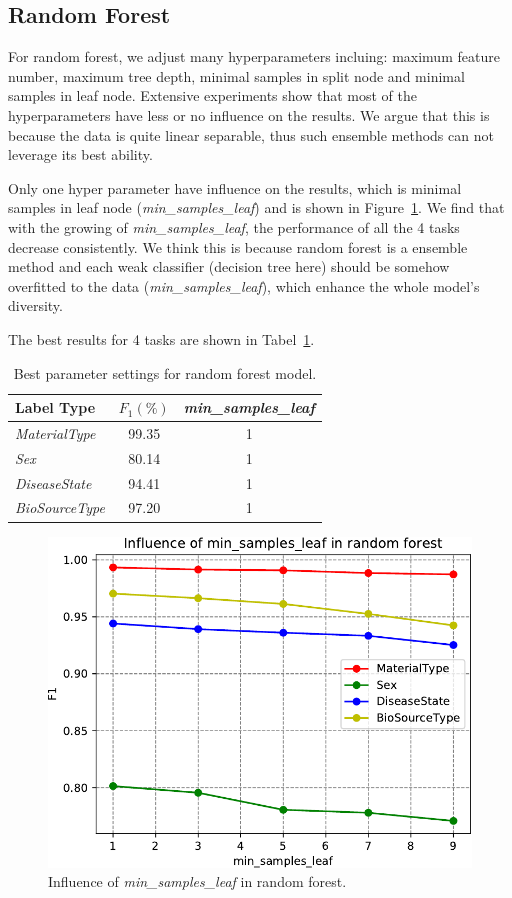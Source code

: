 \documentclass[sigconf]{acmart}
\begin{document}
	 
	\subsection{Random Forest}
	For random forest, we adjust many hyperparameters incluing: maximum feature number, maximum tree depth, minimal samples in split node and minimal samples in leaf node. Extensive experiments show that most of the hyperparameters have less or no influence on the results. We argue that this is because the data is quite linear separable, thus such ensemble methods can not leverage its best ability. 
	
	Only one hyper parameter have influence on the results, which is minimal samples in leaf node (\textit{min\_samples\_leaf}) and is shown in Figure~\ref{fig:min_samples_leaf}. We find that with the growing of \textit{min\_samples\_leaf}, the performance of all the 4 tasks decrease consistently. We think this is because random forest is a ensemble method and each weak classifier (decision tree here) should be somehow overfitted to the data (\textit{min\_samples\_leaf}), which enhance the whole model's diversity.
	
	The best results for 4 tasks are shown in Tabel~\ref{tab:RF}.
	\begin{table}[tbp]
		\centering
		\begin{tabular}{l|cc}
			\toprule
			{Label Type} & $F_1 (\%)$& \textit{min\_samples\_leaf}  \\
			\midrule
			{\textit{MaterialType}}&99.35 &1\\
			{\textit{Sex}}		& 80.14  &1\\
			{\textit{DiseaseState}}& 94.41&1 \\
			{\textit{BioSourceType}}& 97.20 &1\\
			\bottomrule	
		\end{tabular}
		\caption{Best parameter settings for random forest model. }
		\label{tab:RF}
	\end{table}
	 
	
\begin{figure}[h]
\centering
\includegraphics[width=0.8\linewidth]{../figs/min_samples_leaf}
\caption{Influence of \textit{min\_samples\_leaf} in random forest.}
\label{fig:min_samples_leaf}
\end{figure}
	
\end{document}
